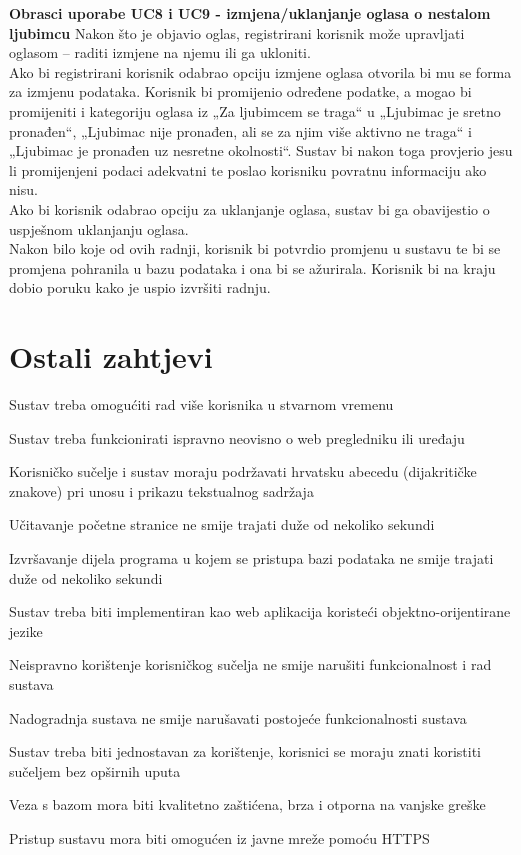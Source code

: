 			\noindent\textbf{Obrasci uporabe UC8 i UC9 - izmjena/uklanjanje oglasa o nestalom ljubimcu}\newline
			\noindent Nakon što je objavio oglas, registrirani korisnik može upravljati oglasom – raditi izmjene na njemu ili ga ukloniti. \\
Ako bi registrirani korisnik odabrao opciju izmjene oglasa otvorila bi mu se forma za izmjenu podataka. Korisnik bi promijenio određene podatke, a mogao bi promijeniti i kategoriju oglasa iz „Za ljubimcem se traga“ u „Ljubimac je sretno pronađen“, „Ljubimac nije pronađen, ali se za njim više aktivno ne traga“ i „Ljubimac je pronađen uz nesretne okolnosti“. Sustav bi nakon toga provjerio jesu li promijenjeni podaci adekvatni te poslao korisniku povratnu informaciju ako nisu. \\
Ako bi korisnik odabrao opciju za uklanjanje oglasa, sustav bi ga obavijestio o uspješnom uklanjanju oglasa.\\
Nakon bilo koje od ovih radnji, korisnik bi potvrdio promjenu u sustavu te bi se promjena pohranila u bazu podataka i ona bi se ažurirala. Korisnik bi na kraju dobio poruku kako je uspio izvršiti radnju.

	
		\section{Ostali zahtjevi}
		 
			 \begin{packed_item}
			 
			 \item Sustav treba omogućiti rad više korisnika u stvarnom vremenu
			 \item Sustav treba funkcionirati ispravno neovisno o web pregledniku ili uređaju
			 \item Korisničko sučelje i sustav moraju podržavati hrvatsku abecedu (dijakritičke znakove) pri unosu i prikazu tekstualnog sadržaja
			 \item Učitavanje početne stranice ne smije trajati duže od nekoliko sekundi
			 \item Izvršavanje dijela programa u kojem se pristupa bazi podataka ne smije trajati duže od nekoliko sekundi
			 \item Sustav treba biti implementiran kao web aplikacija koristeći objektno-orijentirane jezike
			 \item Neispravno korištenje korisničkog sučelja ne smije narušiti funkcionalnost i rad sustava
			 \item Nadogradnja sustava ne smije narušavati postojeće funkcionalnosti sustava
			 \item Sustav treba biti jednostavan za korištenje, korisnici se moraju znati koristiti sučeljem bez opširnih uputa
			 \item Veza s bazom mora biti kvalitetno zaštićena, brza i otporna na vanjske greške
			 \item Pristup sustavu mora biti omogućen iz javne mreže pomoću HTTPS
			 
			 
			 \end{packed_item}
			 
			 
			 
	